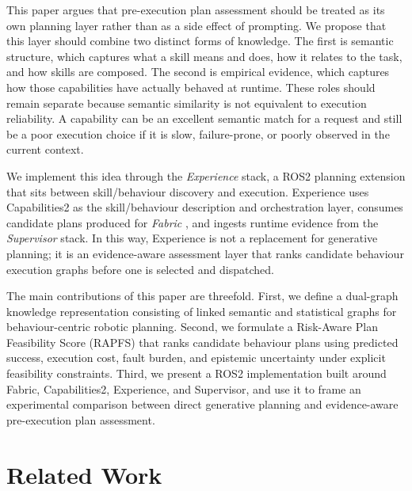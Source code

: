 \documentclass[letterpaper, 10pt, conference]{ieeeconf}
\begin{document}
This paper argues that pre-execution plan assessment should be treated as its own planning layer rather than as a side effect of prompting. We propose that this layer should combine two distinct forms of knowledge. The first is semantic structure, which captures what a skill means and does, how it relates to the task, and how skills are composed. The second is empirical evidence, which captures how those capabilities have actually behaved at runtime. These roles should remain separate because semantic similarity is not equivalent to execution reliability. A capability can be an excellent semantic match for a request and still be a poor execution choice if it is slow, failure-prone, or poorly observed in the current context.

We implement this idea through the \textit{Experience} stack, a ROS2 planning extension that sits between skill/behaviour discovery and execution. Experience uses Capabilities2 \cite{pritchard_capabilities2_2025, woodall_ros_2014} as the skill/behaviour description and orchestration layer, consumes candidate plans produced for \textit{Fabric} \cite{ratnayake2026generativepartiallyspecifiedfinite}, and ingests runtime evidence from the \textit{Supervisor} stack. In this way, Experience is not a replacement for generative planning; it is an evidence-aware assessment layer that ranks candidate behaviour execution graphs before one is selected and dispatched.

The main contributions of this paper are threefold. First, we define a dual-graph knowledge representation consisting of linked semantic and statistical graphs for behaviour-centric robotic planning. Second, we formulate a Risk-Aware Plan Feasibility Score (RAPFS) that ranks candidate behaviour plans using predicted success, execution cost, fault burden, and epistemic uncertainty under explicit feasibility constraints. Third, we present a ROS2 implementation built around Fabric, Capabilities2, Experience, and Supervisor, and use it to frame an experimental comparison between direct generative planning and evidence-aware pre-execution plan assessment.

\section{Related Work}
\end{document}
